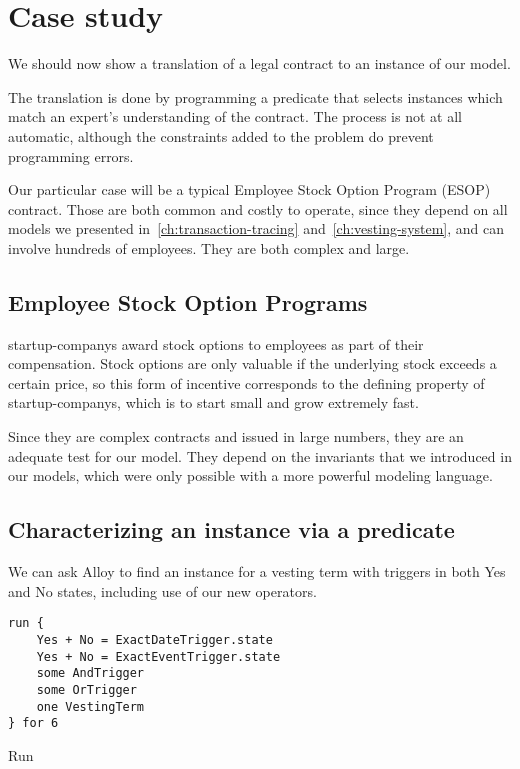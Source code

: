 \chapter{Case study}\label{ch:contract}

We should now show a translation of a legal contract to an instance of our model. 

The translation is done by programming a predicate that selects instances which match an expert's understanding of the contract. The process is not at all automatic, although the constraints added to the problem do prevent programming errors.

Our particular case will be a typical Employee Stock Option Program (ESOP) contract. Those are both common and costly to operate, since they depend on all models we presented in~\ref{ch:transaction-tracing} and~\ref{ch:vesting-system}, and can involve hundreds of employees. They are both complex and large.

\section{Employee Stock Option Programs}

\Glspl{startup-company} award stock options to employees as part of their compensation. Stock options are only valuable if the underlying stock exceeds a certain price, so this form of incentive corresponds to the defining property of \glspl{startup-company}, which is to start small and grow extremely fast.

Since they are complex contracts and issued in large numbers, they are an adequate test for our model. They depend on the invariants that we introduced in our models, which were only possible with a more powerful modeling language.

\section{Characterizing an instance via a predicate}

We can ask Alloy to find an instance for a vesting term with triggers in both Yes and No states, including use of our new operators.

\begin{listing}[H]\label{fig:vs:run-vesting-term}
	\begin{verbatim}
run { 
    Yes + No = ExactDateTrigger.state
    Yes + No = ExactEventTrigger.state
    some AndTrigger
    some OrTrigger
    one VestingTerm
} for 6
\end{verbatim}
	\caption{Run}
\end{listing}

